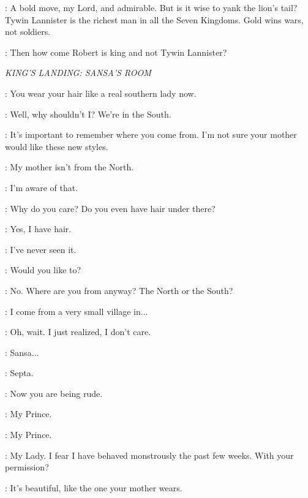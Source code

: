 
\LITTLEFINGER: A bold move, my Lord, and admirable. But is it wise to yank the lion's tail? Tywin Lannister is the richest man in all the Seven Kingdoms. Gold wins wars, not soldiers.

\NED: Then how come Robert is king and not Tywin Lannister? 


\scene

\textit{KING'S LANDING: SANSA'S ROOM} 


\SEPTAMORDANE: You wear your hair like a real southern lady now. 

\SANSA: Well, why shouldn't I? We're in the South. 

\SEPTAMORDANE: It's important to remember where you come from. I'm not sure your mother would like these new styles. 

\SANSA: My mother isn't from the North. 

\SEPTAMORDANE: I'm aware of that. 

\SANSA: Why do you care? Do you even have hair under there? 

\SEPTAMORDANE: Yes, I have hair. 

\SANSA: I've never seen it. 

\SEPTAMORDANE: Would you like to? 

\SANSA: No. Where are you from anyway? The North or the South? 

\SEPTAMORDANE: I come from a very small village in$\ldots$ 

\SANSA: Oh, wait. I just realized, I don't care. 

\SEPTAMORDANE: Sansa$\ldots$ 

\SANSA: Septa. 

\SEPTAMORDANE: Now you are being rude.


\SEPTAMORDANE: My Prince. 

\SANSA: My Prince. 

\JOFFREY: My Lady. I fear I have behaved monstrously the past few weeks.  With your permission?


\SANSA: It's beautiful, like the one your mother wears. 

